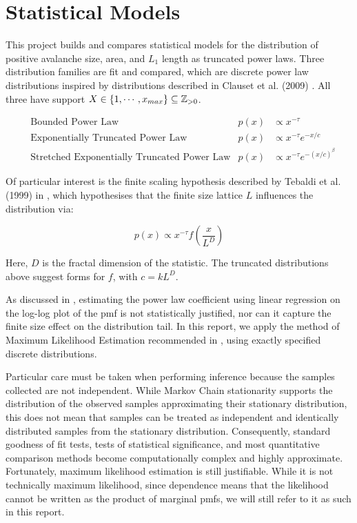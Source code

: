 
\section{Statistical Models} \label{sec:stats}

This project builds and compares statistical models for the distribution of positive avalanche size, area, and $L_1$ length as truncated power laws. Three distribution families are fit and compared, which are discrete power law distributions inspired by distributions described in Clauset et al. (2009) \cite{clauset2009power}. All three have support $X \in \{1, \cdots, x_{max}\} \subseteq \mathbb{Z}_{>0}$.

\begin{align*}
    &\text{Bounded Power Law} & p(x) &\propto x^{-\tau} \\
    &\text{Exponentially Truncated Power Law} & p(x) &\propto x^{-\tau} e^{-x/c} \\
    &\text{Stretched Exponentially Truncated Power Law} & p(x) &\propto x^{-\tau} e^{-(x/c)^\beta}
\end{align*}

Of particular interest is the finite scaling hypothesis described by Tebaldi et al. (1999) in \cite{tebaldi1999multifractal}, which hypothesises that the finite size lattice $L$ influences the distribution via:

\[p(x) \propto x^{-\tau} f\left(\frac{x}{L^D}\right)\]

Here, $D$ is the fractal dimension of the statistic. The truncated distributions above suggest forms for $f$, with $c = k L ^D$.

As discussed in \cite{clauset2009power}, estimating the power law coefficient using linear regression on the log-log plot of the pmf is not statistically justified, nor can it capture the finite size effect on the distribution tail. In this report, we apply the method of Maximum Likelihood Estimation recommended in \cite{clauset2009power}, using exactly specified discrete distributions.

Particular care must be taken when performing inference because the samples collected are not independent. While Markov Chain stationarity supports the distribution of the observed samples approximating their stationary distribution, this does not mean that samples can be treated as independent and identically distributed samples from the stationary distribution. Consequently, standard goodness of fit tests, tests of statistical significance, and most quantitative comparison methods become computationally complex and highly approximate. Fortunately, maximum likelihood estimation is still justifiable. While it is not technically maximum likelihood, since dependence means that the likelihood cannot be written as the product of marginal pmfs, we will still refer to it as such in this report.